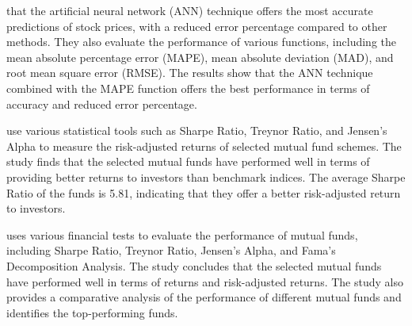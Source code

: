  that the artificial neural network (ANN) technique offers the most accurate predictions of stock prices, with a reduced error percentage compared to other methods. They also evaluate the performance of various functions, including the mean absolute percentage error (MAPE), mean absolute deviation (MAD), and root mean square error (RMSE). The results show that the ANN technique combined with the MAPE function offers the best performance in terms of accuracy and reduced error percentage. 

 use various statistical tools such as Sharpe Ratio, Treynor Ratio, and Jensen's Alpha to measure the risk-adjusted returns of selected mutual fund schemes. The study finds that the selected mutual funds have performed well in terms of providing better returns to investors than benchmark indices. The average Sharpe Ratio of the funds is 5.81, indicating that they offer a better risk-adjusted return to investors. 

 uses various financial tests to evaluate the performance of mutual funds, including Sharpe Ratio, Treynor Ratio, Jensen's Alpha, and Fama's Decomposition Analysis. The study concludes that the selected mutual funds have performed well in terms of returns and risk-adjusted returns. The study also provides a comparative analysis of the performance of different mutual funds and identifies the top-performing funds. 

